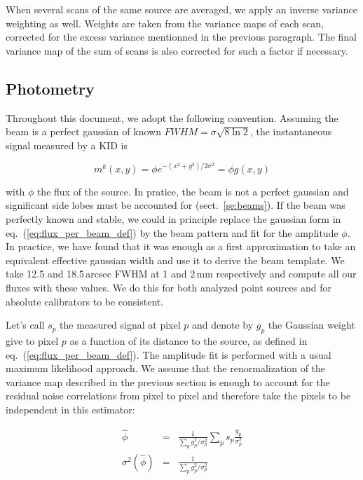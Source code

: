 When several scans of the same source are averaged, we apply an inverse
variance weighting as well. Weights are taken from the variance maps of each scan,
corrected for the excess variance mentionned in the previous paragraph. The
final variance map of the sum of scans is also corrected for such a factor if necessary.

\subsection{Photometry}
\label{se:photometry}

Throughout this document, we adopt the following convention. Assuming the beam
is a perfect gaussian of known $FWHM=\sigma\sqrt{8\ln 2}$, the instantaneous
signal measured by a KID is

\begin{equation}
m^k(x,y) = \phi e^{-(x^2+y^2)/2\sigma^2} = \phi g(x,y)
\label{eq:flux_per_beam_def}
\end{equation}

with $\phi$ the flux of the source. In pratice, the beam is not a perfect
gaussian and significant side lobes must be accounted for
(sect.~\ref{se:beams}). If the beam was perfectly known and stable, we could in
principle replace the gaussian form in eq.~(\ref{eq:flux_per_beam_def}) by the
beam pattern and fit for the amplitude $\phi$. In practice, we have found that
it was enough as a first approximation to take an equivalent effective gaussian
width and use it to derive the beam template. We take 12.5 and 18.5\,arcsec FWHM
at 1 and 2\,mm respectively and compute all our fluxes with these
values. We do this for both analyzed point sources and for absolute calibrators
to be consistent.

Let's call $s_p$ the measured signal at pixel $p$ and denote by $g_p$ the
Gaussian weight give to pixel $p$ as a function of its distance to the source,
as defined in eq.~(\ref{eq:flux_per_beam_def}). The amplitude fit is performed
with a usual maximum likelihood approach. We assume that the renormalization of
the variance map described in the previous section is enough to account for the
residual noise correlations from pixel to pixel and therefore take the pixels to
be independent in this estimator:

\begin{eqnarray}
\hat{\phi} &=& \frac{1}{\sum_p g_p^2/\sigma_p^2}\sum_p
s_p\frac{g_p}{\sigma_p^2} \label{eq:flux_estim_def} \\
\sigma^2(\hat{\phi}) &=& \frac{1}{\sum_p
  g_p^2/\sigma_p^2} \label{eq:flux_estim_var_def}
\end{eqnarray}

